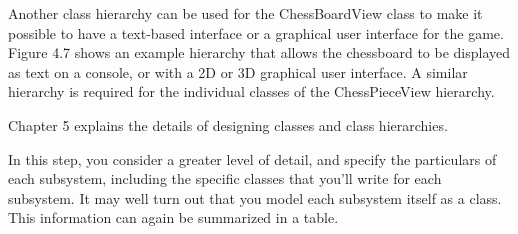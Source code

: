 
Another class hierarchy can be used for the ChessBoardView class to make it possible to have a text-based interface or a graphical user interface for the game. Figure 4.7 shows an example hierarchy that allows the chessboard to be displayed as text on a console, or with a 2D or 3D graphical user interface. A similar hierarchy is required for the individual classes of the ChessPieceView hierarchy.


Chapter 5 explains the details of designing classes and class hierarchies.


In this step, you consider a greater level of detail, and specify the particulars of each subsystem, including the specific classes that you’ll write for each subsystem. It may well turn out that you model each subsystem itself as a class. This information can again be summarized in a table.

